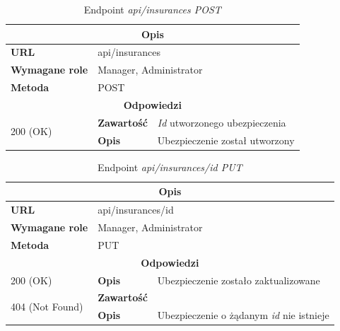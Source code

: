 \documentclass[eng,printmode,openany]{mgr}
\begin{document}
	\begin{table}[H]
		\caption{Endpoint \textit{api/insurances POST}}
		\begin{tabularx}{\textwidth}{|l|l|X|}
			\hline
			\multicolumn{3}{|c|}{\textbf{\textbf{Opis}}}
			\\ \hline
			\textbf{URL}                       & \multicolumn{2}{l|}{api/insurances}
			\\ \hline
			\textbf{Wymagane role}             & \multicolumn{2}{l|}{Manager, Administrator}
			\\ \hline
			\textbf{Metoda}                    & \multicolumn{2}{l|}{POST}
			\\ \hline
			\multicolumn{3}{|c|}{\textbf{Odpowiedzi}}
			\\ \hline
			\multirow{2}{*}{200 (OK)} 		& \textbf{Zawartość}     & \textit{Id} utworzonego ubezpieczenia
			\\ \cline{2-3}                  & \textbf{Opis}         	& Ubezpieczenie został utworzony
			\\ \hline
		\end{tabularx}
	\end{table}
	
	\begin{table}[H]
		\caption{Endpoint \textit{api/insurances/id PUT}}
		\begin{tabularx}{\textwidth}{|l|l|X|}
			\hline
			\multicolumn{3}{|c|}{\textbf{\textbf{Opis}}}
			\\ \hline
			\textbf{URL}                       & \multicolumn{2}{l|}{api/insurances/id}
			\\ \hline
			\textbf{Wymagane role}             & \multicolumn{2}{l|}{Manager, Administrator}
			\\ \hline
			\textbf{Metoda}                    & \multicolumn{2}{l|}{PUT}
			\\ \hline
			\multicolumn{3}{|c|}{\textbf{Odpowiedzi}}
			\\ \hline
			200 (OK) 		                        & \textbf{Opis}      	& Ubezpieczenie zostało zaktualizowane
			\\ \hline
			\multirow{2}{*}{404 (Not Found)} 	    & \textbf{Zawartość}     & 
			\\ \cline{2-3}                          & \textbf{Opis}          & Ubezpieczenie o żądanym \textit{id} nie istnieje
			\\ \hline
		\end{tabularx}
	\end{table}
	
\end{document}
